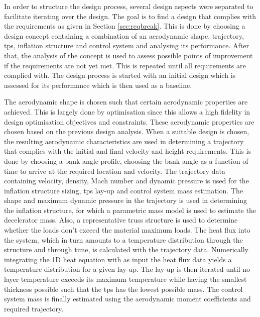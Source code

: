 In order to structure the design process, several design aspects were separated to facilitate  iterating over the design. The goal is to find a design that complies with the requirements as given in Section \ref{sec:reqbreak}. This is done by choosing a design concept containing a combination of an aerodynamic shape, trajectory, \gls{tps}, inflation structure and control system and analysing its performance. After that, the analysis of the concept is used to assess possible points of improvement if the requirements are not yet met. This is repeated until all requirements are complied with. The design process is started with an initial design which is assessed for its performance which is then used as a baseline.

The aerodynamic shape is chosen such that certain aerodynamic properties are achieved. This is largely done by optimisation since this allows a high fidelity in design optimisation objectives and constraints. These aerodynamic properties are chosen based on the previous design analysis. 
When a suitable design is chosen, the resulting aerodynamic characteristics are used in determining a trajectory that complies with the initial and final velocity and height requirements. This is done by choosing a bank angle profile, choosing the bank angle as a function of time to arrive at the required location and velocity. 
The trajectory data containing velocity, density, Mach number and dynamic pressure is used for the inflation structure sizing, \gls{tps} lay-up and control system mass estimation. The shape and maximum dynamic pressure in the trajectory is used in determining the inflation structure, for which a parametric mass model is used to estimate the decelerator mass. 
Also, a representative truss structure is used to determine whether the loads don't exceed the material maximum loads. The heat flux into the system, which in turn amounts to a temperature distribution through the structure and through time, is calculated with the trajectory data. Numerically integrating the 1D heat equation with as input the heat flux data yields a temperature distribution for a given lay-up. The lay-up is then iterated until no layer temperature exceeds its maximum temperature while having the smallest thickness possible such that the \gls{tps} has the lowest possible mass. 
The control system mass is finally estimated using the aerodynamic moment coefficients and required trajectory.


